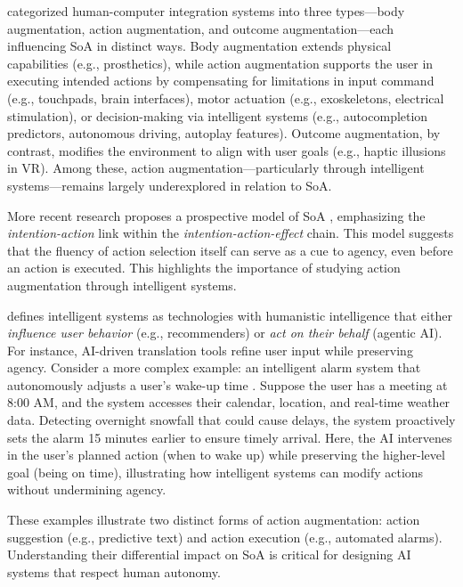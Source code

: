 \documentclass[12pt]{article}
\begin{document}
\citet{cornelio2022sense} categorized human-computer integration systems into three types—body augmentation, action augmentation, and outcome augmentation—each influencing SoA in distinct ways. Body augmentation extends physical capabilities (e.g., prosthetics), while action augmentation supports the user in executing intended actions by compensating for limitations in input command (e.g., touchpads, brain interfaces), motor actuation (e.g., exoskeletons, electrical stimulation), or decision-making via intelligent systems (e.g., autocompletion predictors, autonomous driving, autoplay features). Outcome augmentation, by contrast, modifies the environment to align with user goals (e.g., haptic illusions in VR). Among these, action augmentation—particularly through intelligent systems—remains largely underexplored in relation to SoA.

More recent research proposes a prospective model of SoA \citep{wenke2010subliminal, chambon2012sense, chambon2014action, sidarus2017investigating}, emphasizing the \textit{intention-action} link within the \textit{intention-action-effect} chain. This model suggests that the fluency of action selection itself can serve as a cue to agency, even before an action is executed. This highlights the importance of studying action augmentation through intelligent systems.

\citet{mann1998humanistic} defines intelligent systems as technologies with humanistic intelligence that either \textit{influence user behavior} (e.g., recommenders) or \textit{act on their behalf} (agentic AI). For instance, AI-driven translation tools refine user input while preserving agency. Consider a more complex example: an intelligent alarm system that autonomously adjusts a user’s wake-up time \citep{cornelio2022sense}. Suppose the user has a meeting at 8:00 AM, and the system accesses their calendar, location, and real-time weather data. Detecting overnight snowfall that could cause delays, the system proactively sets the alarm 15 minutes earlier to ensure timely arrival. Here, the AI intervenes in the user’s planned action (when to wake up) while preserving the higher-level goal (being on time), illustrating how intelligent systems can modify actions without undermining agency.

These examples illustrate two distinct forms of action augmentation: action suggestion (e.g., predictive text) and action execution (e.g., automated alarms). Understanding their differential impact on SoA is critical for designing AI systems that respect human autonomy.
\end{document}
